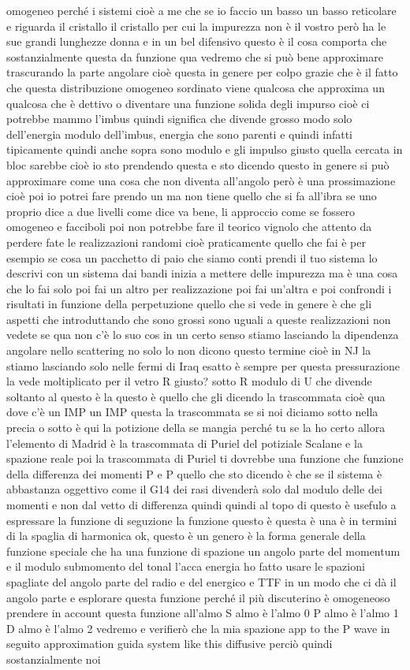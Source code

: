 omogeneo perché i sistemi cioè a me che se io faccio un basso un basso reticolare e riguarda il cristallo il cristallo per cui la impurezza non è il vostro però ha le sue grandi lunghezze donna e in un bel difensivo questo è il cosa comporta che sostanzialmente questa da funzione qua vedremo che si può bene approximare trascurando la parte angolare cioè questa in genere per colpo grazie che è il fatto che questa distribuzione omogeneo sordinato viene qualcosa che approxima un qualcosa che è dettivo o diventare una funzione solida degli impurso cioè ci potrebbe mammo l'imbus quindi significa che divende grosso modo solo dell'energia modulo dell'imbus, energia che sono parenti e quindi infatti tipicamente quindi anche sopra sono modulo e gli impulso giusto quella cercata in bloc sarebbe cioè io sto prendendo questa e sto dicendo questo in genere si può approximare come una cosa che non diventa all'angolo però è una prossimazione cioè poi io potrei fare prendo un ma non tiene quello che si fa all'ibra se uno proprio dice a due livelli come dice va bene, li approccio come se fossero omogeneo e facciboli poi non potrebbe fare il teorico vignolo che attento da perdere fate le realizzazioni randomi cioè praticamente quello che fai è per esempio se cosa un pacchetto di paio che siamo conti prendi il tuo sistema lo descrivi con un sistema dai bandi inizia a mettere delle impurezza ma è una cosa che lo fai solo poi fai un altro per realizzazione poi fai un'altra e poi confrondi i risultati in funzione della perpetuzione quello che si vede in genere è che gli aspetti che introduttando che sono grossi sono uguali a queste realizzazioni non vedete se qua non c'è lo suo cos in un certo senso stiamo lasciando la dipendenza angolare nello scattering no solo lo non dicono questo termine cioè in NJ la stiamo lasciando solo nelle fermi di Iraq esatto è sempre per questa pressurazione la vede moltiplicato per il vetro R giusto? sotto R modulo di U che divende soltanto al questo è la questo è quello che gli dicendo la trascommata cioè qua dove c'è un IMP un IMP questa la trascommata se si noi diciamo sotto nella precia o sotto è qui la potizione della se mangia perché tu se la ho certo allora l'elemento di Madrid è la trascommata di Puriel del potiziale Scalane e la spazione reale poi la trascommata di Puriel ti dovrebbe una funzione che funzione della differenza dei momenti P e P quello che sto dicendo è che se il sistema è abbastanza oggettivo come il G14 dei rasi divenderà solo dal modulo delle dei momenti e non dal vetto di differenza quindi quindi al topo di questo è usefulo a espressare la funzione di seguzione la funzione questo è questa è una è in termini di la spaglia di harmonica ok, questo è un genero è la forma generale della funzione speciale che ha una funzione di spazione un angolo parte del momentum e il modulo submomento del tonal l'acca energia ho fatto usare le spazioni spagliate del angolo parte del radio e del energico e TTF in un modo che ci dà il angolo parte e esplorare questa funzione perché il più discuterino è omogeneoso prendere in account questa funzione all'almo S almo è l'almo 0 P almo è l'almo 1 D almo è l'almo 2 vedremo e verifierò che la mia spazione app to the P wave in seguito approximation guida system like this diffusive perciò quindi sostanzialmente noi 